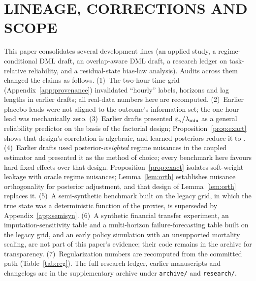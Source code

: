 \section{LINEAGE, CORRECTIONS AND SCOPE}
\label{app:lineage}
This paper consolidates several development lines (an applied study, a regime-conditional DML draft, an overlap-aware DML draft, a research ledger on task-relative reliability, and a residual-state bias-law analysis). Audits across them changed the claims as follows. (1)~The two-hour time grid (Appendix~\ref{app:provenance}) invalidated ``hourly'' labels, horizons and lag lengths in earlier drafts; all real-data numbers here are recomputed. (2)~Earlier placebo leads were not aligned to the outcome's information set; the one-hour lead was mechanically zero. (3)~Earlier drafts presented $\varepsilon_\gamma/\lambda_{\min}$ as a general reliability predictor on the basis of the factorial design; Proposition~\ref{prop:exact} shows that design's correlation is algebraic, and learned posteriors reduce it to \LPRhoD. (4)~Earlier drafts used posterior-\emph{weighted} regime nuisances in the coupled estimator and presented it as the method of choice; every benchmark here favours hard fixed effects over that design. Proposition~\ref{prop:exact} isolates soft-weight leakage with oracle regime nuisances; Lemma~\ref{lem:orth} establishes nuisance orthogonality for posterior adjustment, and that design of Lemma~\ref{lem:orth} replaces it. (5)~A semi-synthetic benchmark built on the legacy grid, in which the true state was a deterministic function of the proxies, is superseded by Appendix~\ref{app:semisyn}. (6)~A synthetic financial transfer experiment, an imputation-sensitivity table and a multi-horizon failure-forecasting table built on the legacy grid, and an early policy simulation with an unsupported mortality scaling, are not part of this paper's evidence; their code remains in the archive for transparency. (7)~Regularization numbers are recomputed from the committed path (Table~\ref{tab:reg}). The full research ledger, earlier manuscripts and changelogs are in the supplementary archive under \texttt{archive/} and \texttt{research/}.
